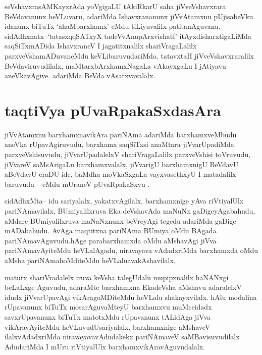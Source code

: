 \begin{artha}
seVshavxrasAMKayxrAda yoVgigaLU tAkiRkarU saha jiVveVshavxrara
BeVdavanunx heVLuvaru, adariMda Ishavxrananunx jiVvAtamxnu
pUjisabeVku. idanunx biTuTx `ahaMbarxhamx' eMdu tiLiyuvalilx
patitanAguvanu. sidAdhxnatx--`tatasxqqSATxyX tadeVvAnupArxvishatf'
itAyxdishurxtigaLiMda saqSiTxmADida IshavxraneV I jagatitxnalilx
shariVragaLalilx parxveVshamADuvaneMdu keVLibaruvudariMda. tatavxtaH
jiVveVshavxraralilx BeVdaviruvudilalx, maMtarxbArxhamxNagaLa
vAkayxgaLu I jAtiyavu aneVkavAgive. adariMda BeVda vAsatxvavalalx. 
\end{artha}


\section*{taqtiVya pUvaRpakaSxdasAra}


\begin{artha}
jiVvAtamxnu barxhamxnavikAra pariNAma adariMda barxhamxveMbudu aneVka rUpavAgiruvudu, barxhamx saqSiTxsi anaMtara jiVvarUpadiMda parxveVshisuvudu, jiVvarUpadalelxV shariVragaLalilx parxveVshisi toVruvudu, jiVvareV  saMsArigaLu barxhamxvalalx, jiVvarigU barxhamxnigU BeVdavU aBeVdavU eraDU ide, baMdha moVkaSxgaLa vayxvasethxyU I matadalilx baruvudu -- eMdu mUraneV pUvaRpakaSxvu .
\end{artha}


\begin{artha}
sidAdhxMta-- idu sariyalalx, yakatxvAgilalx, barxhamxnige yAva
riVtiyalUlx pariNAmavilalx, BUmiyalilxruva Eka deVshavAda maNuNx
gaDigeyAgabahudu, aMdare BUmiyalilxruva maNaNxnunx beVreyAgi tegedu
adariMda gaDige mADabahudu. AvAga maqtitxna pariNAma BUmiya oMdu
BAgada pariNAmavAguvudu.hAge parabarxhamxda oMdu aMshavAgi jiVva
pariNAmavAyiteMdu heVLalAgadu, niravayava vAdadxriMda barxhamxda oMdu
aMsha pariNAmahoMditeMdu heVLaluavakAshavilalx.
\end{artha}

\begin{artha}
matutx shariVradalelx iruva keVsha talegUdalu mupipxnalilx haNANxgi
beLaLxge Aguvudu, adaraMte  barxhamxna EkadeVsha aMshavu adaralelxV
idudx jiVvarUpavAgi vikAragoMDiteMdu heVLalu shakayxvilalx. hAlu
modalina rUpavanunx biTuTx mosarAguvaMteyU barxhamxvu muMceidadx
savxrUpavanunx biTuTx matotxMdu rUpavanunx tALidAga jiVva
vikAravAyiteMdu heVLuvudUsariyalalx. barxhamxnige aMshaveV
ilalxvAdadxriMda niravayavavAdudakekx pariNAmaveV saMBavisuvudilalx
AdudariMda I mUru riVtiyalUlx barxhamxvikAravAguvudalalx.
\end{artha}



